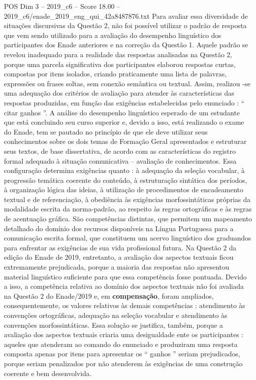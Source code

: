 \begin{textsample}{POS Dim 3 – 2019\_c6 – Score 18.00 – 2019\_c6/enade\_2019\_eng\_qui\_42a8487876.txt}
Para avaliar essa diversidade de situações discursivas da Questão 2, não foi possível utilizar o padrão de resposta que vem sendo utilizado para a avaliação do desempenho linguístico dos participantes dos Enade anteriores e na correção da Questão 1.
Aquele padrão se revelou inadequado para a realidade das respostas analisadas na Questão 2, porque uma parcela significativa dos participantes elaborou respostas curtas, compostas por itens isolados, criando praticamente uma lista de palavras, expressões ou frases soltas, sem conexão semântica ou textual.
Assim, realizou -se uma adequação dos critérios de avaliação para atender às características das respostas produzidas, em função das exigências estabelecidas pelo enunciado : “ citar ganhos ”.
A análise do desempenho linguístico esperado de um estudante que está concluindo seu curso superior e, devido a isso, está realizando o exame do Enade, tem se pautado no princípio de que ele deve utilizar seus conhecimentos sobre os dois temas de Formação Geral apresentados e estruturar seus textos, de base dissertativa, de acordo com as características do registro formal adequado à situação comunicativa – avaliação de conhecimentos.
Essa configuração determina exigências quanto : à adequação da seleção vocabular, à progressão temática coerente do conteúdo, à estruturação sintática dos períodos, à organização lógica das ideias, à utilização de procedimentos de encadeamento textual e de referenciação, à obediência às exigências morfossintáticas próprias da modalidade escrita da norma-padrão, ao respeito às regras ortográficas e às regras de acentuação gráfica.
São competências distintas, que permitem um mapeamento detalhado do domínio dos recursos disponíveis na Língua Portuguesa para a comunicação escrita formal, que constituem um acervo linguístico dos graduandos para enfrentar as exigências de sua vida profissional futura.
Na Questão 2 da edição do Enade de 2019, entretanto, a avaliação dos aspectos textuais ficou extremamente prejudicada, porque a maioria das respostas não apresentou material linguístico suficiente para que essa competência fosse pontuada.
Devido a isso, a competência relativa ao domínio dos aspectos textuais não foi avaliada na Questão 2 do Enade/2019 e, em \textbf{compensação}, foram ampliados, consequentemente, os valores relativos às demais competências : atendimento às convenções ortográficas, adequação na seleção vocabular e atendimento às convenções morfossintáticas.
Essa solução se justifica, também, porque a avaliação dos aspectos textuais criaria uma desigualdade ente os participantes : aqueles que atenderam ao comando do enunciado e produziram uma resposta composta apenas por itens para apresentar os “ ganhos ” seriam prejudicados, porque seriam penalizados por não atenderem às exigências de uma construção coerente e bem desenvolvida.

\end{textsample}
